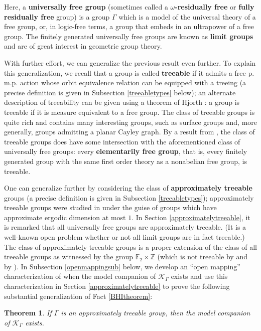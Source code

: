 \documentclass[12pt]{amsart}
\newtheorem*{thm*}{Theorem}
\theoremstyle{definition}
\def\cal{\mathcal}
\newcommand{\pmp}{p{$.$}m{$.$}p{$.$}}
\begin{document}
Here, a \textbf{universally free group} (sometimes called a \textbf{$\omega$-residually free} or \textbf{fully residually free} group) is a group $\Gamma$ which is a model of the universal theory of a free group, or, in logic-free terms, a group that embeds in an ultrapower of a free group.  The finitely generated universally free groups are known as \textbf{limit groups} and are of great interest in geometric group theory.

With further effort, we can generalize the previous result even further.  To explain this generalization, we recall that a group is called \textbf{treeable} if it admits a free {\pmp} action whose orbit equivalence relation can be equipped with a treeing (a precise definition is given in Subsection \ref{treeabletypes} below); 
an alternate description of treeability can be given using a theorem of Hjorth \cite{HjorthME}:  
a group is treeable if it is measure equivalent to a free group.  The class of treeable groups is quite rich and contains many interesting groups, such as surface groups and, more generally, groups admitting a planar Cayley graph.
By a result from \cite{BTW}, the class of treeable groups does have some intersection with the aforementioned class of universally free groups:  every \textbf{elementarily free group}, that is, every finitely generated group with the same first order theory as a nonabelian free group, is treeable.  

One can generalize further by considering the class of \textbf{approximately treeable} groups (a precise definition is given in Subsection \ref{treeabletypes}); approximately treeable groups were studied in \cite{Gab02} under the guise of groups which have approximate ergodic dimension at most $1$. 
In Section \ref{approximatelytreeable}, it is remarked that all universally free groups are approximately treeable.  
(It is a well-known open problem whether or not all limit groups are in fact treeable.)  
The class of approximately treeable groups is a proper extension of the class of all treeable groups as witnessed by the group $\mathbb{F}_2\times \mathbb{Z}$ (which is not treeable by \cite{Gab00} and by \cite{PP00}).  
In Subsection \ref{openmappingsub} below, we develop an ``open mapping'' characterization of when the model companion of $\cal K_\Gamma$ exists and use this characterization in Section \ref{approximatelytreeable} to prove the following substantial generalization of Fact \ref{BHItheorem}:

\begin{thm*}
If $\Gamma$ is an approximately treeable group, then the model companion of $\cal K_\Gamma$ exists.
\end{thm*}
\end{document}
